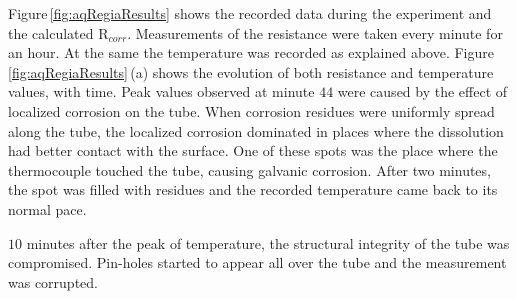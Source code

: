 \documentclass[journal,twoside,web]{ieeecolor}
\begin{document}
Figure\,\ref{fig:aqRegiaResults} shows the recorded data during the experiment and the calculated R$_{corr}$. Measurements of the resistance were taken every minute for an hour. At the same the temperature was recorded as explained above. Figure\,\ref{fig:aqRegiaResults}\,(a) shows the evolution of both resistance and temperature values, with time. Peak values observed at minute $44$ were caused by the effect of localized corrosion on the tube. When corrosion residues were uniformly spread along the tube, the localized corrosion dominated in places where the dissolution had better contact with the surface. One of these spots was the place where the thermocouple touched the tube, causing galvanic corrosion. After two minutes, the spot was filled with residues and the recorded temperature came back to its normal pace.

$10$ minutes after the peak of temperature, the structural integrity of the tube was compromised. Pin-holes started to appear all over the tube and the measurement was corrupted.
\end{document}
